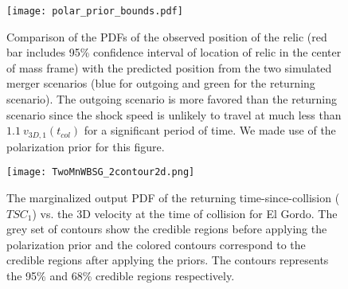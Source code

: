 


\begin{figure}
	\texttt{[image: polar\_prior\_bounds.pdf]}
	\caption{Comparison of the PDFs of the observed position of the relic (red bar
		includes 95\% confidence interval of location of relic in the center of
		mass frame) with the	predicted position from the two simulated merger scenarios (blue for
	outgoing and green for the returning scenario). The outgoing scenario
	is more favored than the returning scenario since the shock speed is
	unlikely to travel at much less than $1.1~v_{3D,1}(t_{col})$ for a
	significant period of time. We made use of the polarization prior 
	for this figure. 
	\label{fig: positionprior}}
\end{figure}

\begin{figure}
	\texttt{[image: TwoMnWBSG\_2contour2d.png]}
	\caption{The marginalized output PDF of the returning time-since-collision
($TSC_1$) vs. the 3D velocity at the time of collision for El Gordo. The
grey set of contours show the credible regions before applying the
polarization prior and the colored contours correspond to the credible
regions after applying the priors. The contours represents the 95\% and
68\% credible regions respectively. }
	\label{fig:TSC_v3D}
\end{figure}

